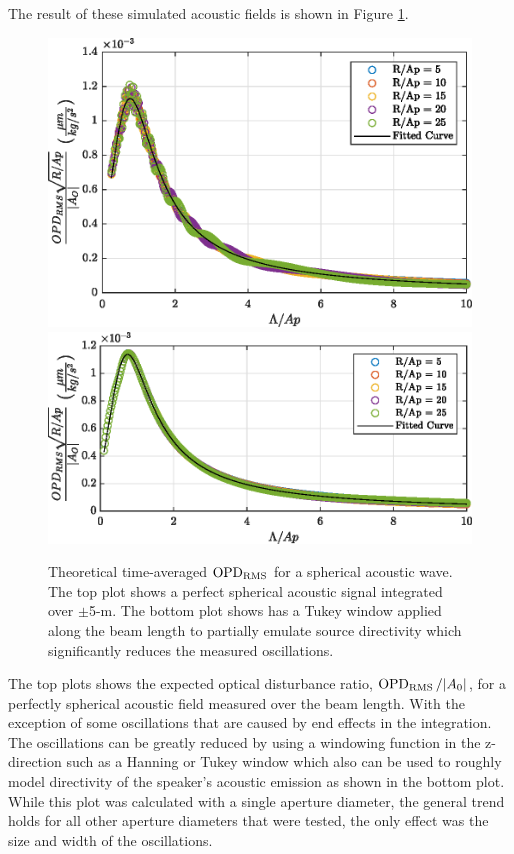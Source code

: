 The result of these simulated acoustic fields is shown in Figure \ref{fig:03_spherical_sample}.
\begin{figure}
  \centering
  \includegraphics{../matlab/03_aero_optics_acoustics/spherical_sample.eps}
  \includegraphics{../matlab/03_aero_optics_acoustics/spherical_sample_win.eps}
  \caption{Theoretical time-averaged $\operatorname{OPD_{RMS}}$ for a spherical acoustic wave. The top plot shows a perfect spherical acoustic signal integrated over $\pm$5-m. The bottom plot shows has a Tukey window applied along the beam length to partially emulate source directivity which significantly reduces the measured oscillations.}
  \label{fig:03_spherical_sample}
\end{figure}
The top plots shows the expected optical disturbance ratio, $\operatorname{OPD_{RMS}}/|A_0|$, for a perfectly spherical acoustic field measured over the beam length.
With the exception of some oscillations that are caused by end effects in the integration.
The oscillations can be greatly reduced by using a windowing function in the z-direction such as a Hanning or Tukey window which also can be used to roughly model directivity of the speaker's acoustic emission as shown in the bottom plot.
While this plot was calculated with a single aperture diameter, the general trend holds for all other aperture diameters that were tested, the only effect was the size and width of the oscillations.

